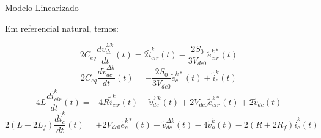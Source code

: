\begin{frame}{Modelo Linearizado}

Em referencial natural, temos:


\begin{equation*}
2 C_{eq} \frac{d \tilde{v}_{dc}^{\Sigma k}}{dt}(t) = 
2 \tilde{i}_{cir}^{k}(t) 
- \frac{2 S_0}{3 V_{dc0}} \tilde{e}_{cir}^{k*}(t)
\end{equation*}
%
\begin{equation*}
2 C_{eq}  \frac{d \tilde{v}_{dc}^{\Delta k}}{dt}(t) = 
- \frac{2 S_0}{3 V_{dc0}} \tilde{e}_c^{k*}(t) 
+ \tilde{i}_c^{k}(t)
\end{equation*}
%
\begin{equation*}
4 L \frac{d \tilde{i}_{cir}^{k}}{dt}(t) = 
- 4R \tilde{i}_{cir}^{k}(t)
- \tilde{v}_{dc}^{\Sigma k}(t) +  
2V_{dc0} \tilde{e}_{cir}^{k*}(t) 
+ 2  \tilde{v}_{dc}(t)
\end{equation*}
%
\begin{equation*}
 2\left( L + 2 L_f \right)  \frac{d \tilde{i}_c^k}{dt}(t) =   
 +  2V_{dc0}\tilde{e}_c^{k*}(t) -
  \tilde{v}_{dc}^{\Delta k}(t)  
 - 4 \tilde{v}_o^k(t) 
- 2\left(R + 2 R_f \right) \tilde{i}_c^k(t)
\end{equation*}




\end{frame}